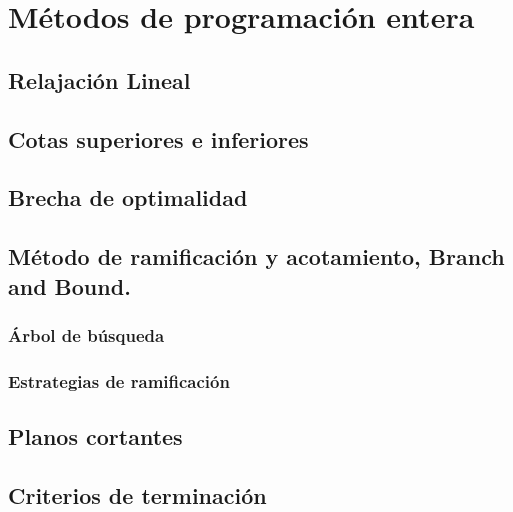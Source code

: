 \section{Métodos de programación entera}

\subsection{Relajación Lineal}

\subsection{Cotas superiores e inferiores}

\subsection{Brecha de optimalidad}

\subsection{Método de ramificación y acotamiento, Branch and Bound.}

\subsubsection{Árbol de búsqueda}

\subsubsection{Estrategias de ramificación}

\subsection{Planos cortantes}

\subsection{Criterios de terminación}
